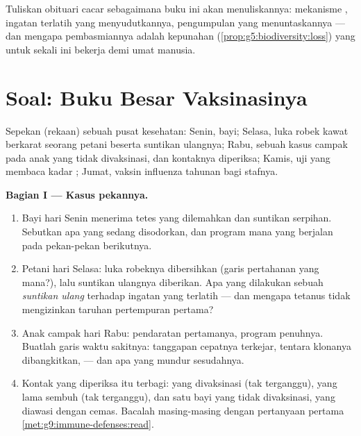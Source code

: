 \begin{exercise}[$\star\star\star$]\label{exo:g9:immune-defenses:12}
Tuliskan obituari cacar sebagaimana buku ini akan
menuliskannya: mekanisme , ingatan terlatih yang
menyudutkannya, pengumpulan yang menuntaskannya --- dan
mengapa pembasmiannya adalah kepunahan
(\cref{prop:g5:biodiversity:loss}) yang untuk sekali ini
bekerja demi umat manusia.
\end{exercise}

\section{Soal: Buku Besar Vaksinasinya}

\begin{problem}\label{pb:g9:immune-defenses:1}
Sepekan (rekaan) sebuah pusat kesehatan: Senin, 
bayi; Selasa, luka robek kawat berkarat seorang petani
beserta suntikan ulangnya; Rabu, sebuah kasus campak pada
anak yang tidak divaksinasi, dan kontaknya diperiksa; Kamis,
uji  yang membaca kadar ; Jumat, vaksin
influenza tahunan bagi stafnya.

\medskip\noindent\textbf{Bagian I --- Kasus pekannya.}
\begin{enumerate}
  \item Bayi hari Senin menerima tetes  yang
        dilemahkan dan suntikan serpihan. Sebutkan apa yang
        sedang disodorkan, dan program mana yang berjalan
        pada pekan-pekan berikutnya.
  \item Petani hari Selasa: luka robeknya dibersihkan (garis
        pertahanan yang mana?), lalu suntikan ulangnya
        diberikan. Apa yang dilakukan sebuah \emph{suntikan
        ulang} terhadap ingatan yang terlatih --- dan mengapa
        tetanus tidak mengizinkan taruhan pertempuran pertama?
  \item Anak campak hari Rabu: pendaratan pertamanya,
        program penuhnya. Buatlah garis waktu sakitnya:
        tanggapan cepatnya terkejar, tentara klonanya
        dibangkitkan,  --- dan apa yang mundur
        sesudahnya.
  \item Kontak yang diperiksa itu terbagi: yang divaksinasi
        (tak terganggu), yang lama sembuh (tak terganggu),
        dan satu bayi yang tidak divaksinasi, yang diawasi
        dengan cemas. Bacalah masing-masing dengan pertanyaan
        pertama \cref{met:g9:immune-defenses:read}.
\end{enumerate}


\end{problem}

